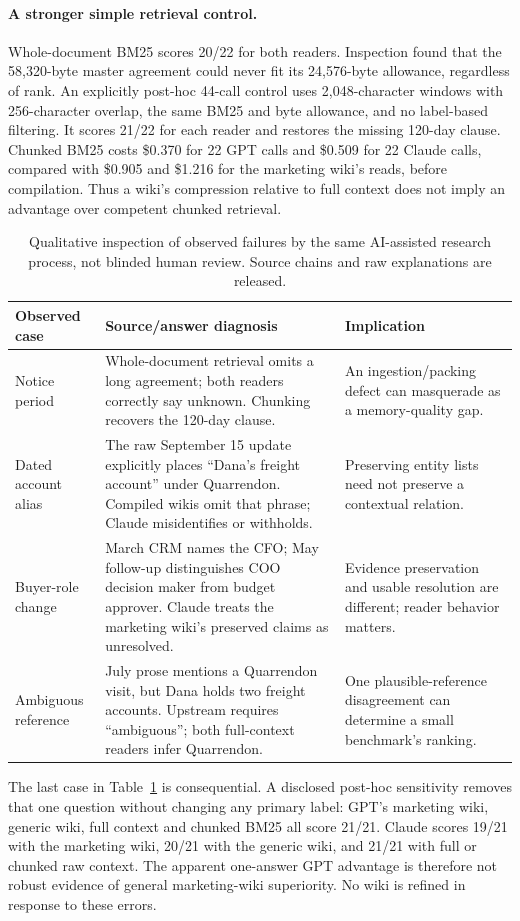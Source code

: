\paragraph{A stronger simple retrieval control.}
Whole-document BM25 scores 20/22 for both readers. Inspection found that the 58,320-byte master agreement could never fit its 24,576-byte allowance, regardless of rank. An explicitly post-hoc 44-call control uses 2,048-character windows with 256-character overlap, the same BM25 and byte allowance, and no label-based filtering. It scores 21/22 for each reader and restores the missing 120-day clause. Chunked BM25 costs \$0.370 for 22 GPT calls and \$0.509 for 22 Claude calls, compared with \$0.905 and \$1.216 for the marketing wiki's reads, before compilation. Thus a wiki's compression relative to full context does not imply an advantage over competent chunked retrieval.

\begin{table}[t]
\centering\small
\begin{tabularx}{\linewidth}{@{}p{.20\linewidth}XX@{}}
\toprule
Observed case & Source/answer diagnosis & Implication \\
\midrule
Notice period & Whole-document retrieval omits a long agreement; both readers correctly say unknown. Chunking recovers the 120-day clause. & An ingestion/packing defect can masquerade as a memory-quality gap. \\
Dated account alias & The raw September 15 update explicitly places ``Dana's freight account'' under Quarrendon. Compiled wikis omit that phrase; Claude misidentifies or withholds. & Preserving entity lists need not preserve a contextual relation. \\
Buyer-role change & March CRM names the CFO; May follow-up distinguishes COO decision maker from budget approver. Claude treats the marketing wiki's preserved claims as unresolved. & Evidence preservation and usable resolution are different; reader behavior matters. \\
Ambiguous reference & July prose mentions a Quarrendon visit, but Dana holds two freight accounts. Upstream requires ``ambiguous''; both full-context readers infer Quarrendon. & One plausible-reference disagreement can determine a small benchmark's ranking. \\
\bottomrule
\end{tabularx}
\caption{Qualitative inspection of observed failures by the same AI-assisted research process, not blinded human review. Source chains and raw explanations are released.}
\label{tab:qualitative}
\end{table}

The last case in Table~\ref{tab:qualitative} is consequential. A disclosed post-hoc sensitivity removes that one question without changing any primary label: GPT's marketing wiki, generic wiki, full context and chunked BM25 all score 21/21. Claude scores 19/21 with the marketing wiki, 20/21 with the generic wiki, and 21/21 with full or chunked raw context. The apparent one-answer GPT advantage is therefore not robust evidence of general marketing-wiki superiority. No wiki is refined in response to these errors.
